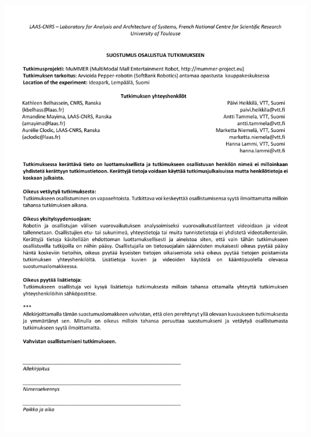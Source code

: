 \begin{center}
	\includegraphics[page=2, width=\textwidth]{figures/annexe1/consent_form_finnish.pdf} 
\end{center}

